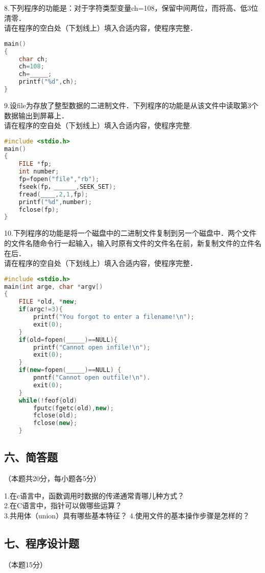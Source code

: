 8.下列程序的功能是：对于字符类型变量ch=108，保留中间两位，而将高、低3位清零． \\
请在程序的空白处（下划线上）填入合适内容，使程序完整．
\begin{lstlisting}[language=cpp]
main()
{
    char ch;
    ch=108;
    ch=_____;
    printf("%d",ch);
}
\end{lstlisting}

9.设file为存放了整型数据的二进制文件．下列程序的功能是从该文件中读取第3个数据输出到屏幕上． \\
请在程序的空自处（下划线上）填入合适内容，使程序完整.
\begin{lstlisting}[language=cpp]
#include <stdio.h>
main()
{
    FILE *fp;
    int number;
    fp=fopen("file","rb");
    fseek(fp，______,SEEK_SET);
    fread(____,2,1,fp);
    printf("%d",number);
    fclose(fp);
}
\end{lstlisting}

10.下列程序的功能是将一个磁盘中的二进制文件复制到另一个磁盘中．两个文件的文件名随命令行一起输入，输入时原有文件的文件名在前，新复制文件的立件名在后． \\
请在程序的空自处（下划线上）填入合适内容，使程序完整．
\begin{lstlisting}[language=cpp]
#include <stdio.h>
main(int arge, char *argv[)
{
    FILE *old, *new;
    if(argc!=3){
        printf("You forgot to enter a filename!\n");
        exit(0);
    }
    if(old=fopen(_____)==NULL){
        printf("Cannot open infile!\n");
        exit(0);
    }
    if(new=fopen(_____)==NULL) {
        pnntf("Cannot open outfile!\n").
        exit(0);
    }
    while(!feof{old)
        fputc(fgetc(old),new);
        fclose(old);
        fclose(new};
    }
\end{lstlisting}

\subsection{六、简答题}
（本题共20分，每小题各5分）

1.在c语言中，函数调用时数据的传递通常青哪儿种方式？ \\
2.在C语言中，指针可以做哪些运算？ \\
3.共用体（union）具有哪些基本特征？
4.使用文件的基本操作步骤是怎样的？

\subsection{七、程序设计题}
（本题15分）

